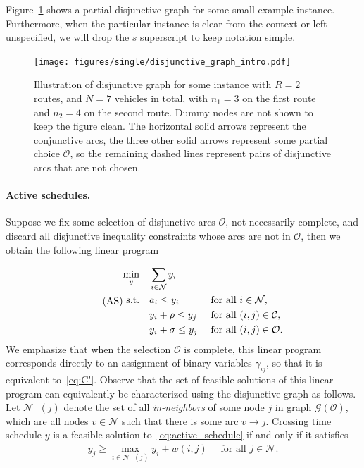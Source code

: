 \documentclass[a4paper]{report}
\theoremstyle{definition}
\theoremstyle{plain}
\begin{document}
Figure~\ref{fig:disjunctive-graph-intro} shows a partial disjunctive graph for
some small example instance. Furthermore, when the particular instance is clear
from the context or left unspecified, we will drop the $s$ superscript to keep
notation simple.

\begin{figure}
  \centering
  \texttt{[image: figures/single/disjunctive\_graph\_intro.pdf]}
  \caption{Illustration of disjunctive graph for some instance with $R=2$
    routes, and $N=7$ vehicles in total, with $n_{1} = 3$ on the first route and
    $n_{2} = 4$ on the second route. Dummy nodes are not shown to keep the
    figure clean. The horizontal solid arrows represent the conjunctive arcs,
    the three other solid arrows represent some partial choice $\mathcal{O}$, so
    the remaining dashed lines represent pairs of disjunctive arcs that are not
    chosen.}\label{fig:disjunctive-graph-intro}
\end{figure}

\paragraph{Active schedules.}

Suppose we fix some selection of disjunctive arcs $\mathcal{O}$, not
necessarily complete, and discard all disjunctive inequality constraints whose
arcs are not in $\mathcal{O}$, then we obtain the following linear program

\begin{equation}\label{eq:active_schedule}\tag{AS}
\begin{alignedat}{3}
  \min_{y} \quad & \sum_{i \in \mathcal{N}} y_{i} \\
  \text{s.t.} \quad & a_{i} \leq y_{i} && \quad \text{ for all } i \in \mathcal{N}, \notag \\
                 & y_{i} + \rho \leq y_{j} && \quad \text{ for all } (i,j) \in \mathcal{C}, \notag \\
                 & y_{i} + \sigma \leq y_{j} && \quad \text{ for all } (i,j) \in \mathcal{O} . \notag
\end{alignedat}
\end{equation}
We emphasize that when the selection $\mathcal{O}$ is complete, this linear
program corresponds directly to an assignment of binary variables $\gamma_{ij}$, so
that it is equivalent to~\eqref{eq:C'}.
%
Observe that the set of feasible solutions of this linear program can
equivalently be characterized using the disjunctive graph as follows.
%
Let $\mathcal{N}^{-}(j)$ denote the set of all \emph{in-neighbors} of some node
$j$ in graph $\mathcal{G}(\mathcal{O})$, which are all nodes $v \in \mathcal{N}$ such that
there is some arc $v \rightarrow j$.
%
Crossing time schedule $y$ is a feasible solution to~\eqref{eq:active_schedule} if and only if it
satisfies
\begin{align}\label{eq:feasible-schedule}
    y_j \geq \max_{i \in \mathcal{N}^{-}(j)} y_i + w(i,j)
    \quad \text{ for all } j \in \mathcal{N} .
\end{align}
\end{document}
